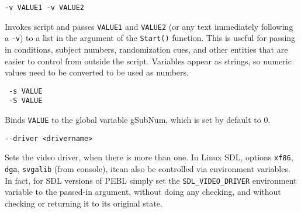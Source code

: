 \begin{description}

\item
\begin{verbatim}
-v VALUE1 -v VALUE2
\end{verbatim}
  Invokes script and passes \texttt{VALUE1} and \texttt{VALUE2} (or any text
  immediately following a \texttt{-v}) to a list in the argument of
  the \texttt{Start()}  function. \newline This is useful for passing in
  conditions, subject numbers, randomization cues, and other
  entities that are easier to control from outside  the
  script.  Variables appear as strings, so numeric values
  need to be converted to be used as numbers.

\item
\begin{verbatim}
 -s VALUE
 -S VALUE
\end{verbatim}
  Binds \texttt{VALUE} to the global variable gSubNum, which is set by
  default to 0.

\item 
\begin{verbatim}
--driver <drivername>
\end{verbatim}
  Sets the video driver, when there is more than one.  In Linux SDL,
  options \texttt{xf86}, \texttt{dga}, \texttt{svgalib} (from
  console), itcan also be controlled via environment variables.  In
  fact, for SDL versions of PEBL simply set the
  \texttt{SDL\_VIDEO\_DRIVER} environment variable to the passed-in
  argument, without doing any checking, and without checking or
  returning it to its original state.


\end{description}
